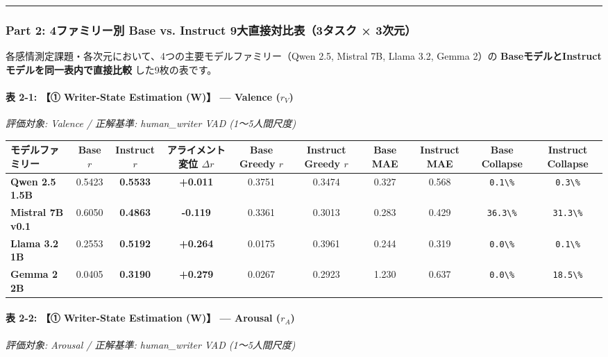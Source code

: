 \vspace{0.5em}\hrule\vspace{0.5em}

\subsubsection{Part 2: 4ファミリー別 Base vs. Instruct 9大直接対比表（3タスク × 3次元）}

各感情測定課題・各次元において、4つの主要モデルファミリー（Qwen 2.5, Mistral 7B, Llama 3.2, Gemma 2）の \textbf{BaseモデルとInstructモデルを同一表内で直接比較} した9枚の表です。

\paragraph{表 2-1: 【① Writer-State Estimation (W)】 — Valence ($r_V$)}
\textit{評価対象: Valence / 正解基準: human\_writer VAD (1〜5人間尺度)}

\begin{center}
\small
\begin{tabular}{lccccccccc}
\toprule
\textbf{モデルファミリー} & \textbf{Base $r$} & \textbf{Instruct $r$} & \textbf{アライメント変位 $\Delta r$} & \textbf{Base Greedy $r$} & \textbf{Instruct Greedy $r$} & \textbf{Base MAE} & \textbf{Instruct MAE} & \textbf{Base Collapse} & \textbf{Instruct Collapse} \\
\midrule
\textbf{Qwen 2.5 1.5B} & 0.5423 & \textbf{0.5533} & \textbf{+0.011} & 0.3751 & 0.3474 & 0.327 & 0.568 & \texttt{0.1\textbackslash{}\%} & \texttt{0.3\textbackslash{}\%} \\
\textbf{Mistral 7B v0.1} & 0.6050 & \textbf{0.4863} & \textbf{-0.119} & 0.3361 & 0.3013 & 0.283 & 0.429 & \texttt{36.3\textbackslash{}\%} & \texttt{31.3\textbackslash{}\%} \\
\textbf{Llama 3.2 1B} & 0.2553 & \textbf{0.5192} & \textbf{+0.264} & 0.0175 & 0.3961 & 0.244 & 0.319 & \texttt{0.0\textbackslash{}\%} & \texttt{0.1\textbackslash{}\%} \\
\textbf{Gemma 2 2B} & 0.0405 & \textbf{0.3190} & \textbf{+0.279} & 0.0267 & 0.2923 & 1.230 & 0.637 & \texttt{0.0\textbackslash{}\%} & \texttt{18.5\textbackslash{}\%} \\
\bottomrule
\end{tabular}
\end{center}


\paragraph{表 2-2: 【① Writer-State Estimation (W)】 — Arousal ($r_A$)}
\textit{評価対象: Arousal / 正解基準: human\_writer VAD (1〜5人間尺度)}

